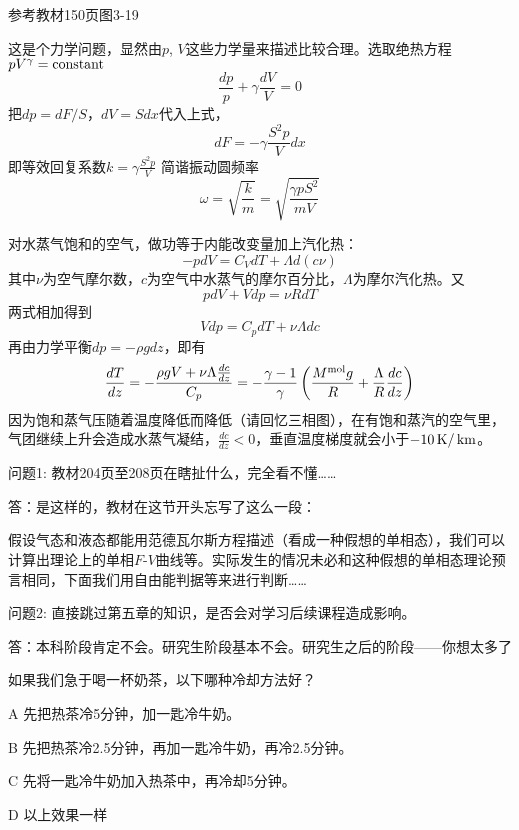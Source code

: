 \documentclass[CJK]{beamer}
\begin{document}
\begin{frame}
\bch
参考教材150页图3-19

这是个力学问题，显然由$p$, $V$这些力学量来描述比较合理。选取绝热方程$pV^\gamma = \mathrm{constant}$
$$ \frac{dp}{p} + \gamma \frac{dV}{V} = 0$$
把$dp = dF/S$，$dV = S dx$代入上式，
$$ dF = -\gamma \frac{S^2p}{V} dx $$
即等效回复系数$k =\gamma \frac{S^2p}{V} $ 简谐振动圆频率
$$\omega = \sqrt{\frac{k}{m}} = \sqrt{\frac{\gamma p S^2}{mV}}$$
\ech
\end{frame}

\begin{frame}
\bch
{\small
对水蒸气饱和的空气，做功等于内能改变量加上汽化热：
$$ -pdV = C_V dT + \Lambda d(c\nu) $$
其中$\nu$为空气摩尔数，$c$为空气中水蒸气的摩尔百分比，$\Lambda$为摩尔汽化热。又
$$pdV + Vdp = \nu R dT$$
两式相加得到
$$ Vdp = C_p  dT + \nu \Lambda dc $$
再由力学平衡$ dp = -\rho g dz$，即有
$$ \frac{dT}{dz} =-\frac{\rho g V + \nu\Lambda\frac{dc}{dz}}{C_p} = -\frac{\gamma-1}{\gamma}\left(\frac{M^{\rm mol}g}{R}+\frac{\Lambda}{R}\frac{dc}{dz}\right)$$
因为饱和蒸气压随着温度降低而降低（请回忆三相图），在有饱和蒸汽的空气里，气团继续上升会造成水蒸气凝结，$ \frac{dc}{dz} < 0 $，垂直温度梯度就会小于$-10\,\mathrm{K}/\,\mathrm{km}$。
}
\ech
\end{frame}


\begin{frame}
  \bch
  问题1: 教材204页至208页在瞎扯什么，完全看不懂……

  \skiplines
  
  答：是这样的，教材在这节开头忘写了这么一段：

  {\small 假设气态和液态都能用范德瓦尔斯方程描述（看成一种假想的单相态），我们可以计算出理论上的单相$F$-$V$曲线等。实际发生的情况未必和这种假想的单相态理论预言相同，下面我们用自由能判据等来进行判断……}

  \ech
\end{frame}


\begin{frame}
  \bch
  问题2: 直接跳过第五章的知识，是否会对学习后续课程造成影响。

  \skiplines
  
  答：本科阶段肯定不会。研究生阶段基本不会。研究生之后的阶段——你想太多了\bye

  \ech
\end{frame}


\begin{frame}
  \bch
  如果我们急于喝一杯奶茶，以下哪种冷却方法好？
  \bitem
\item[A]{先把热茶冷5分钟，加一匙冷牛奶。}
\item[B]{先把热茶冷2.5分钟，再加一匙冷牛奶，再冷2.5分钟。}
\item[C]{先将一匙冷牛奶加入热茶中，再冷却5分钟。}
\item[D]{以上效果一样}
  \eitem
  \ech
\end{frame}
\end{document}
